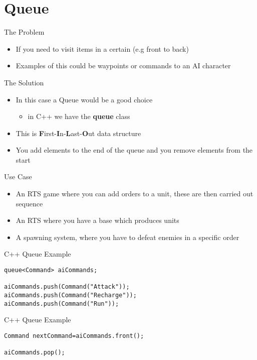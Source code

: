 \part{Queue}
\frame{\partpage}

\begin{frame}{The Problem}
	\begin{itemize}
		\pause \item If you need to visit items in a certain (e.g front to back)
		\pause \item Examples of this could be waypoints or commands to an AI character 
	\end{itemize}
\end{frame}

\begin{frame}{The Solution}
	\begin{itemize}
		\pause \item In this case a Queue would be a good choice
		\begin{itemize}
			\pause \item in C++ we have the \textbf{queue} class
		\end{itemize}
		\pause \item This is \textbf{F}irst-\textbf{I}n-\textbf{L}ast-\textbf{O}ut data structure
		\pause \item You add elements to the end of the queue and you remove elements from the start
	\end{itemize}
\end{frame}

\begin{frame}{Use Case}
	\begin{itemize}
		\pause \item An RTS game where you can add orders to a unit, these are then carried out sequence
		\pause \item An RTS where you have a base which produces units
		\pause \item A spawning system, where you have to defeat enemies in a specific order
	\end{itemize}
\end{frame}

\begin{frame}[fragile]{C++ Queue
Example}
\begin{lstlisting}
queue<Command> aiCommands;

aiCommands.push(Command("Attack"));
aiCommands.push(Command("Recharge"));
aiCommands.push(Command("Run"));
\end{lstlisting}
\end{frame}

\begin{frame}[fragile]{C++ Queue
	Example}
\begin{lstlisting}
Command nextCommand=aiCommands.front();

aiCommands.pop();
\end{lstlisting}
\end{frame}